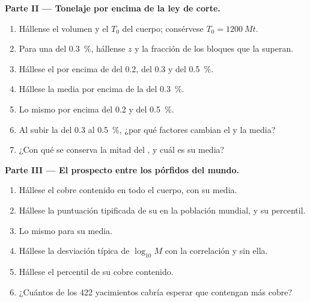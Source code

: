 \begin{problem}
\noindent\textbf{Parte II --- Tonelaje por encima de la ley de corte.}
\begin{enumerate}[resume]
  \item Hállense el volumen y el  $T_0$ del cuerpo; consérvese $T_0 = \qty{1200}{Mt}$.
  \item Para una  del \qty{0.3}{\percent}, hállense $z$ y la fracción de los bloques que la superan.
  \item Hállese el  por encima de  del 0.2, del 0.3 y del \qty{0.5}{\percent}.
  \item Hállese la  media por encima de la  del \qty{0.3}{\percent}.
  \item Lo mismo por encima del 0.2 y del \qty{0.5}{\percent}.
  \item Al subir la  del 0.3 al \qty{0.5}{\percent}, ¿por qué factores cambian el  y la
         media?
  \item ¿Con qué  se conserva la mitad del , y cuál es su  media?
\end{enumerate}

\noindent\textbf{Parte III --- El prospecto entre los pórfidos del mundo.}
\begin{enumerate}[resume]
  \item Hállese el cobre contenido en todo el cuerpo, con su  media.
  \item Hállese la puntuación tipificada de su  en la población mundial, y su percentil.
  \item Lo mismo para su  media.
  \item Hállese la desviación típica de $\log_{10} M$ con la correlación y sin ella.
  \item Hállese el percentil de su cobre contenido.
  \item ¿Cuántos de los 422 yacimientos cabría esperar que contengan más cobre?
\end{enumerate}


\end{problem}
